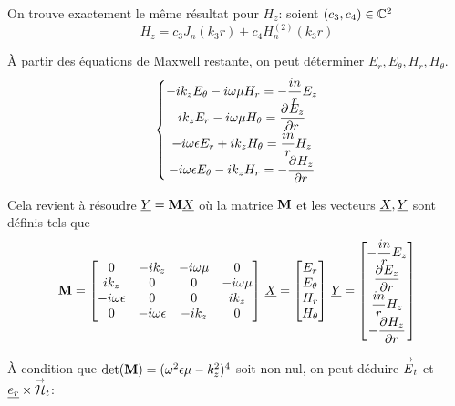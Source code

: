 On trouve exactement le même résultat pour $H_z$: soient $(c_3,c_4) \in \CC^2$
\begin{equation}
    H_z = c_3 J_n\left(k_3r\right) + c_4 H_n^{(2)}\left(k_3r\right)
\end{equation}

À partir des équations de Maxwell restante, on peut déterminer $E_r,E_\theta,H_r,H_\theta$.
\begin{equation}
    \left\lbrace
    \begin{matrix}
        -ik_zE_\theta - i\w\mu H_r = -\frac{in}{r}E_z
        \\
        ik_zE_r - i\w\mu H_\theta = \ddr{r}{E_z}
        \\
        -i\w\eps E_r + ik_z H_\theta = \frac{in}{r}H_z
        \\
        -i\w\eps E_\theta - ik_z H_r = -\ddr{r}{H_z}
    \end{matrix}
    \right.
\end{equation}

Cela revient à résoudre $\v{Y}= \mat{M}\v{X}$ où la matrice $\mat{M}$ et les vecteurs $\v{X}, \v{Y}$ sont définis tels que
\begin{equation}
    \mat{M} =
    \begin{bmatrix}
    0 & -ik_z & -i\w\mu & 0 
    \\
    ik_z & 0 & 0 & -i\w\mu
    \\
    -i\w\eps & 0 & 0 & ik_z
    \\
    0 & -i\w\eps & -ik_z & 0
    \end{bmatrix}
    \,
    \v{X} = 
    \begin{bmatrix}
        E_r\\
        E_\theta\\
        H_r\\
        H_\theta
    \end{bmatrix}
    \,
    \v{Y} = 
    \begin{bmatrix}
        -\frac{in}{r}E_z\\
        \ddr{r}{E_z}\\
        \frac{in}{r}H_z\\
        -\ddr{r}{H_z}
    \end{bmatrix}
\end{equation}

À condition que $\det(\mat{M}) = (\w^2\eps\mu-k_z^2)^4$ soit non nul, on peut déduire $\vE_t$ et $\v{e_r}\times \vH_t$:

